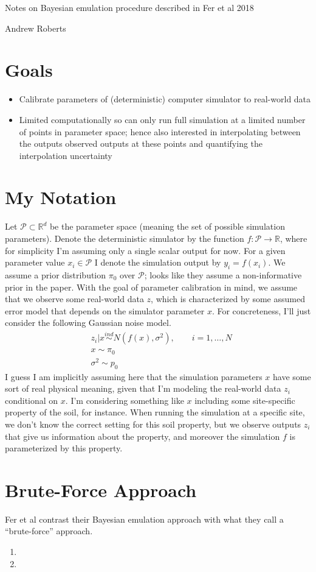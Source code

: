 \documentclass[12pt]{article}
\newcommand{\R}{\mathcal{R}}
\def\R{\mathbb{R}}
\begin{document}
\begin{center}
\Large
Notes on Bayesian emulation procedure described in Fer et al 2018
\end{center}

\begin{flushright}
Andrew Roberts
\end{flushright} 

\section{Goals}
\begin{itemize}
\item Calibrate parameters of (deterministic) computer simulator to real-world data
\item Limited computationally so can only run full simulation at a limited number of points in parameter space; hence also interested in interpolating between the 
outputs observed outputs at these points and quantifying the interpolation uncertainty
\end{itemize}

\section{My Notation}
Let $\mathcal{P} \subset \R^d$ be the parameter space (meaning the set of possible simulation parameters). Denote the deterministic simulator by the function $f: \mathcal{P} \to \R$, 
where for simplicity I'm assuming only a single scalar output for now. For a given parameter value $x_i \in \mathcal{P}$ I denote the simulation output by $y_i = f(x_i)$.
 We assume a prior distribution $\pi_0$ over $\mathcal{P}$; looks like they assume a non-informative prior in the paper. 
With the goal of parameter calibration in mind, we assume that we observe some real-world data $z$, which is characterized by some assumed error model that depends on the simulator parameter
$x$. For concreteness, I'll just consider the following Gaussian noise model. 
\begin{align*}
&z_i|x \overset{ind}{\sim} N(f(x), \sigma^2), \qquad i = 1, \dots, N \\
&x \sim \pi_0 \\
&\sigma^2 \sim p_0
\end{align*}
I guess I am implicitly assuming here that the simulation parameters $x$ have some sort of real physical meaning, given that I'm modeling the real-world data $z_i$ conditional on $x$. 
I'm considering something like $x$ including some site-specific property of the soil, for instance. When running the simulation at a specific site, we don't know the correct setting for this soil 
property, but we observe outputs $z_i$ that give us information about the property, and moreover the simulation $f$ is parameterized by this property.  


\section{Brute-Force Approach}
Fer et al contrast their Bayesian emulation approach with what they call a ``brute-force'' approach.
\begin{enumerate}
\item 
\item 
\end{enumerate}
\end{document}
